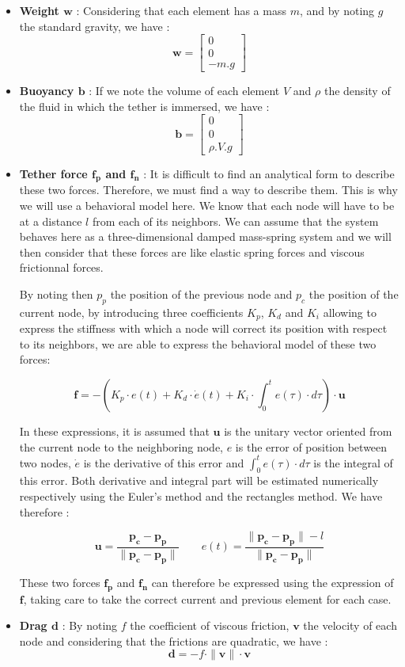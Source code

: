\begin{itemize}
    \item \textbf{Weight $\mathbf{w}$} : Considering that each element has a mass $m$, and by noting $g$ the standard gravity, we have : $$\mathbf{w} = \begin{bmatrix}0\\ 0\\ -m.g\end{bmatrix}$$
    \item \textbf{Buoyancy $\mathbf{b}$} : If we note the volume of each element $V$ and $\rho$ the density of the fluid in which the tether is immersed, we have : $$\mathbf{b} = \begin{bmatrix}0\\ 0\\ \rho.V.g\end{bmatrix}$$
    \item \textbf{Tether force $\mathbf{f_p}$ and $\mathbf{f_n}$} : It is difficult to find an analytical form to describe these two forces. Therefore, we must find a way to describe them. This is why we will use a behavioral model here. We know that each node will have to be at a distance $l$ from each of its neighbors. We can assume that the system behaves here as a three-dimensional damped mass-spring system and we will then consider that these forces are like elastic spring forces and viscous frictionnal forces.

    By noting then $p_{p}$ the position of the previous node and $p_{c}$ the position of the current node, by introducing three coefficients $K_p$, $K_d$ and $K_i$ allowing to express the stiffness with which a node will correct its position with respect to its neighbors, we are able to express the behavioral model of these two forces:
    
    $$\mathbf{f} = - \left(K_p \cdot e(t) + K_d \cdot \dot e(t) + K_i \cdot \int_{0}^te(\tau) \cdot d\tau \right) \cdot \mathbf{u}$$
    
    In these expressions, it is assumed that $\mathbf{u}$ is the unitary vector oriented from the current node to the neighboring node, $e$ is the error of position between two nodes, $\dot e$ is the derivative of this error and $\int_{0}^te(\tau) \cdot d\tau$ is the integral of this error. Both derivative and integral part will be estimated numerically respectively using the Euler's method and the rectangles method. We have therefore :
    
    $$\mathbf{u} = \frac{\mathbf{p_c} - \mathbf{p_p}}{\|\mathbf{p_c} - \mathbf{p_p}\|} \qquad e(t) = \frac{\|\mathbf{p_c} - \mathbf{p_p}\| - l}{\|\mathbf{p_c} - \mathbf{p_p}\|}$$
    
    These two forces $\mathbf{f_p}$ and $\mathbf{f_n}$ can therefore be expressed using the expression of $\mathbf{f}$, taking care to take the correct current and previous element for each case.

    \item \textbf{Drag $\mathbf{d}$} : By noting $f$ the coefficient of viscous friction, $\mathbf{v}$ the velocity of each node and considering that the frictions are quadratic, we have : $$\mathbf{d} = -f \cdot \|\mathbf{v}\| \cdot \mathbf{v}$$
\end{itemize}

